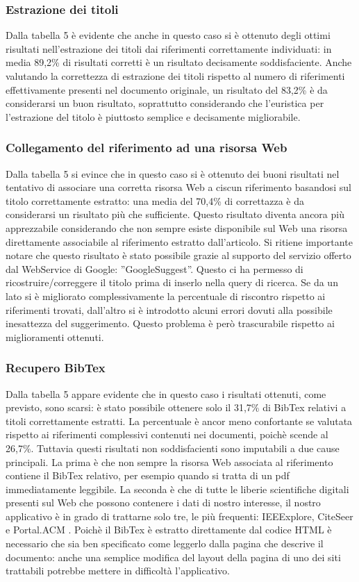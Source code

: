 \subsubsection{Estrazione dei titoli}
Dalla tabella 5 è evidente che anche in questo caso si è ottenuto degli ottimi risultati nell'estrazione dei titoli dai riferimenti correttamente individuati: in media 89,2\% di risultati corretti è un risultato decisamente soddisfaciente. Anche valutando la correttezza di estrazione dei titoli rispetto al numero di riferimenti effettivamente presenti nel documento originale, un risultato del 83,2\% è da considerarsi un buon risultato, soprattutto considerando che l'euristica per l'estrazione del titolo è piuttosto semplice e decisamente migliorabile. 

\subsubsection{Collegamento del riferimento ad una risorsa Web}
Dalla tabella 5 si evince che in questo caso si è ottenuto dei buoni risultati nel tentativo di associare una corretta risorsa Web a ciscun riferimento basandosi sul titolo correttamente estratto: una media del 70,4\% di correttazza è da considerarsi un risultato più che sufficiente. Questo risultato diventa ancora più apprezzabile considerando che non sempre esiste disponibile sul Web una risorsa direttamente associabile al riferimento estratto dall'articolo. Si ritiene importante notare che questo risultato è stato possibile grazie al supporto del servizio offerto dal WebService di Google: ''GoogleSuggest''. Questo ci ha permesso di ricostruire/correggere il titolo prima di inserlo nella query di ricerca. Se da un lato si è migliorato complessivamente la percentuale di riscontro rispetto ai riferimenti trovati, dall'altro si è introdotto alcuni errori dovuti alla possibile inesattezza del suggerimento. Questo problema è però trascurabile rispetto ai miglioramenti ottenuti.

\subsubsection{Recupero BibTex}
Dalla tabella 5 appare evidente che in questo caso i risultati ottenuti, come previsto, sono scarsi: è stato possibile ottenere solo il 31,7\% di BibTex relativi a titoli correttamente estratti. La percentuale è ancor meno confortante se valutata rispetto ai riferimenti complessivi contenuti nei documenti, poichè scende al 26,7\%. Tuttavia questi risultati non soddisfacienti sono imputabili a due cause principali. La prima è che non sempre la risorsa Web associata al riferimento contiene il BibTex relativo, per esempio quando si tratta di un pdf immediatamente leggibile. La seconda è che di tutte le liberie scientifiche digitali presenti sul Web che possono contenere i dati di nostro interesse, il nostro applicativo è in grado di trattarne solo tre, le più frequenti: IEEExplore, CiteSeer e Portal.ACM . Poichè il BibTex è estratto direttamente dal codice HTML è necessario che sia ben specificato come leggerlo dalla pagina che descrive il documento: anche una semplice modifica del layout della pagina di uno dei siti trattabili potrebbe mettere in difficoltà l'applicativo.


